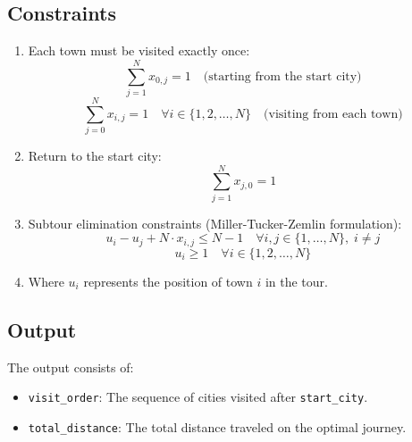 \documentclass{article}
\begin{document}
\subsection*{Constraints}
\begin{enumerate}
    \item Each town must be visited exactly once:
    \[
    \sum_{j=1}^{N} x_{0,j} = 1 \quad \text{(starting from the start city)}
    \]
    \[
    \sum_{j=0}^{N} x_{i,j} = 1 \quad \forall i \in \{1, 2, \ldots, N\} \quad \text{(visiting from each town)}
    \]
    
    \item Return to the start city:
    \[
    \sum_{j=1}^{N} x_{j,0} = 1
    \]

    \item Subtour elimination constraints (Miller-Tucker-Zemlin formulation):
    \[
    u_i - u_j + N \cdot x_{i,j} \leq N-1 \quad \forall i,j \in \{1, \ldots, N\}, \; i \neq j
    \]
    \[
    u_i \geq 1 \quad \forall i \in \{1, 2, \ldots, N\}
    \]
    \item Where \( u_i \) represents the position of town \( i \) in the tour.
\end{enumerate}

\subsection*{Output}
The output consists of:
\begin{itemize}
    \item \texttt{visit\_order}: The sequence of cities visited after \texttt{start\_city}.
    \item \texttt{total\_distance}: The total distance traveled on the optimal journey.
\end{itemize}
\end{document}
